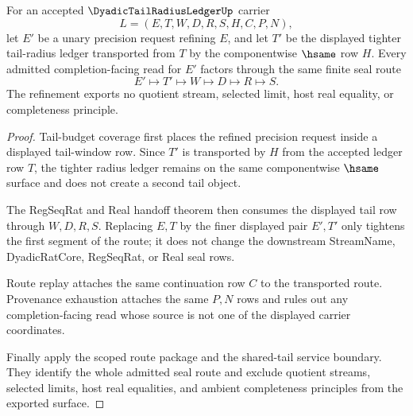 \begin{theorem}
\label{thm:dyadic-tail-radius-ledger-monotone-radius-handoff}
For an accepted $\DyadicTailRadiusLedgerUp$ carrier
$$
L=(E,T,W,D,R,S,H,C,P,N),
$$
let $E'$ be a unary precision request refining $E$, and let $T'$ be the displayed tighter tail-radius ledger transported from $T$ by the componentwise $\hsame$ row $H$. Every admitted completion-facing read for $E'$ factors through the same finite seal route
$$
E' \longmapsto T' \longmapsto W \longmapsto D \longmapsto R \longmapsto S.
$$
The refinement exports no quotient stream, selected limit, host real equality, or completeness principle.
\end{theorem}
\begin{proof}
Tail-budget coverage first places the refined precision request inside a displayed tail-window row. Since $T'$ is transported by $H$ from the accepted ledger row $T$, the tighter radius ledger remains on the same componentwise $\hsame$ surface and does not create a second tail object.

The RegSeqRat and Real handoff theorem then consumes the displayed tail row through $W,D,R,S$. Replacing $E,T$ by the finer displayed pair $E',T'$ only tightens the first segment of the route; it does not change the downstream StreamName, DyadicRatCore, RegSeqRat, or Real seal rows.

Route replay attaches the same continuation row $C$ to the transported route. Provenance exhaustion attaches the same $P,N$ rows and rules out any completion-facing read whose source is not one of the displayed carrier coordinates.

Finally apply the scoped route package and the shared-tail service boundary. They identify the whole admitted seal route and exclude quotient streams, selected limits, host real equalities, and ambient completeness principles from the exported surface.
\end{proof}

